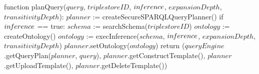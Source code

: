 function planQuery($query$, $triplestoreID$, $in\textrm{\emph{f}}erence$, $expansionDepth$, $transitivityDepth$):
    $planner$ := createSecureSPARQLQueryPlanner()
    if $in\textrm{\emph{f}}erence$ == true:
        $schema$ := searchSchema($triplestoreID$)
        $ontology$ := createOntology()
        $ontology$ := execInference($schema$, $in\textrm{\emph{f}}erence$, $expansionDepth$, $transitivityDepth$)
        $planner$.setOntology($ontology$)   
    return ($queryEngine$.getQueryPlan($planner$, $query$), $planner$.getConstructTemplate(), $planner$.getUploadTemplate(), $planner$.getDeleteTemplate())